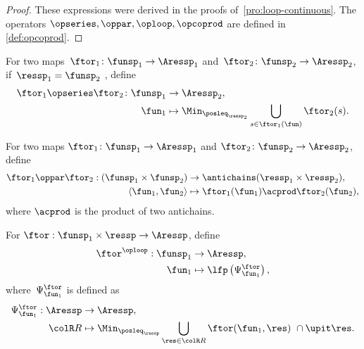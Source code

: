 \begin{proof}
These expressions were derived in the proofs of~\textendash \ref{pro:loop-continuous}.
 The operators $\opseries,\oppar,\oploop,\opcoprod$ are defined
in \textendash \ref{def:opcoprod}.
\end{proof}
\begin{definition}
\label{def:opseries}For two maps~$\ftor_{1}\colon\funsp_{1}\rightarrow\Aressp_{1}$
and~$\ftor_{2}\colon\funsp_{2}\rightarrow\Aressp_{2}$, if~$\ressp_{1}=\funsp_{2}$
, define
\begin{align*}
{\displaystyle \ftor_{1}\opseries\ftor_{2}\colon\funsp_{1}} & \rightarrow\Aressp_{2},\\
\fun_{1} & \mapsto\Min_{\posleq_{\ressp_{2}}}\bigcup_{s\in\ftor_{1}(\fun)}\ftor_{2}(s).
\end{align*}
\end{definition}

\begin{definition}
\label{def:opmaps}For two maps $\ftor_{1}\colon\funsp_{1}\rightarrow\Aressp_{1}$
and $\ftor_{2}\colon\funsp_{2}\rightarrow\Aressp_{2}$, define
\begin{align}
\ftor_{1}\oppar\ftor_{2}:(\funsp_{1}\times\funsp_{2}) & \rightarrow\antichains(\ressp_{1}\times\ressp_{2}),\label{eq:oppar}\\
\left\langle \fun_{1},\fun_{2}\right\rangle  & \mapsto\ftor_{1}(\fun_{1})\acprod\ftor_{2}(\fun_{2}),\nonumber
\end{align}
where $\acprod$ is the product of two antichains.
\end{definition}

\begin{definition}
\label{def:oploop}For $\ftor:\funsp_{1}\times\ressp\rightarrow\Aressp$,
define
\begin{align}
\ftor^{\oploop}:\funsp_{1} & \rightarrow\Aressp,\nonumber \\
\fun_{1} & \mapsto\lfp\left(\Psi_{\fun_{1}}^{\ftor}\right),\label{eq:lfp}
\end{align}
where~$\Psi_{\fun_{1}}^{\ftor}$ is defined as
\begin{align}
\Psi_{\fun_{1}}^{\ftor}:\Aressp & \rightarrow\Aressp,\nonumber \\
{\colR R} & \mapsto\Min_{\posleq_{\ressp}}\bigcup_{\res\in{\colR R}}\ftor(\fun_{1},\res)\ \cap\upit\res.\label{eq:phi}
\end{align}
\end{definition}

